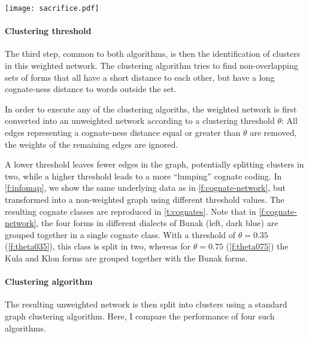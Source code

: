 \documentclass[a4paper,11pt,twocolumn]{scrartcl}
\begin{document}
\begin{figure*}
  \texttt{[image: sacrifice.pdf]} %
  \caption{Network of cognate-ness for the forms meaning ‘sacrifice’, calculated using
    LexStat with the SCA sound class model. Thicker, darker lines represent a
    smaller inferred distance between forms.
    Different colours of the forms indicate different inferred cognate sets, see
    \cref{t:cognates}}
  \label{f:cognate-network}
\end{figure*}
\begin{table*}
  \centering
  \caption{Results of automatic cognate detection on the forms meaning
    ‘sacrifice’, for the networks shown in
    \cref{f:cognate-network,f:theta035,f:theta075}}
  \label{t:cognates}
\end{table*}

\paragraph{Clustering threshold}
The third step, common to both algorithms, is then the identification of
clusters in this weighted network. The clustering algorithm tries to find
non-overlapping sets of forms that all have a short distance to each other, but
have a long cognate-ness distance to words outside the set.

In order to execute any of the clustering algoriths, the weighted network is
first converted into an unweighted network \citeauthor{list2017potential}
according to a clustering threshold $θ$: All edges representing a cognate-ness
distance equal or greater than $θ$ are removed, the weights of the remaining
edges are ignored.

A lower threshold leaves fewer edges in the graph, potentially splitting
clusters in two, while a higher threshold leads to a more “lumping” cognate
coding. In \cref{f:infomap}, we show the same underlying data as in
\cref{f:cognate-network}, but transformed into a non-weighted graph using
different threshold values. The resulting cognate classes are reproduced in
\cref{t:cognates}. Note that in \cref{f:cognate-network}, the four forms in
different dialects of Bunak (left, dark blue) are grouped together in a single
cognate class. With a threshold of $\theta=0.35$ (\cref{f:theta035}), this class
is split in two, whereas for $\theta=0.75$ (\cref{f:theta075}) the Kula and Klon
forms are grouped together with the Bunak forms.

\paragraph{Clustering algorithm}
The resulting unweighted network is then split into clusters using a standard
graph clustering algorithm. Here, I compare the performance of four such
algorithms.
\end{document}
